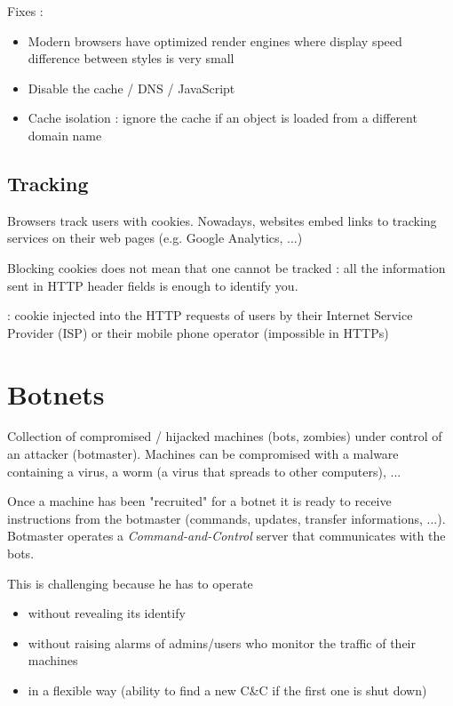 Fixes :
\begin{itemize}
    \item Modern browsers have optimized render engines where display speed difference between styles is very small
    \item Disable the cache / DNS / JavaScript
    \item Cache isolation : ignore the cache if an object is loaded from a different domain name
\end{itemize}

\section{Tracking}

Browsers track users with cookies. Nowadays, websites embed links to tracking services on their web pages (e.g. Google Analytics, ...)

Blocking cookies does not mean that one cannot be tracked : all the information sent in HTTP header fields is enough to identify you.

 : cookie injected into the HTTP requests of users by their Internet Service Provider (ISP) or their mobile phone operator (impossible in HTTPs)

\chapter{Botnets}

Collection of compromised / hijacked machines (bots, zombies) under control of an attacker (botmaster). Machines can be compromised with a malware containing a virus, a worm (a virus that spreads to other computers), ...

Once a machine has been "recruited" for a botnet it is ready to receive instructions from the botmaster (commands, updates, transfer informations, ...). Botmaster operates a \textit{Command-and-Control} server that communicates with the bots.

This is challenging because he has to operate 
\begin{itemize}
    \item without revealing its identify
    \item without raising alarms of admins/users who monitor the traffic of their machines
    \item in a flexible way (ability to find a new C\&C if the first one is shut down)
\end{itemize}

